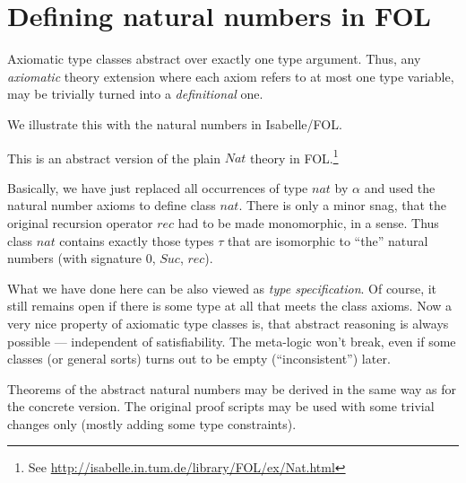 


\section{Defining natural numbers in FOL}\label{sec:ex-natclass}

Axiomatic type classes abstract over exactly one type argument. Thus, any
\emph{axiomatic} theory extension where each axiom refers to at most one type
variable, may be trivially turned into a \emph{definitional} one.

We illustrate this with the natural numbers in Isabelle/FOL.

\bigskip

\bigskip

This is an abstract version of the plain $Nat$ theory in
FOL.\footnote{See \url{http://isabelle.in.tum.de/library/FOL/ex/Nat.html}}

Basically, we have just replaced all occurrences of type $nat$ by $\alpha$ and
used the natural number axioms to define class $nat$.  There is only a minor
snag, that the original recursion operator $rec$ had to be made monomorphic,
in a sense.  Thus class $nat$ contains exactly those types $\tau$ that are
isomorphic to ``the'' natural numbers (with signature $0$, $Suc$, $rec$).

\medskip

What we have done here can be also viewed as \emph{type specification}.  Of
course, it still remains open if there is some type at all that meets the
class axioms.  Now a very nice property of axiomatic type classes is, that
abstract reasoning is always possible --- independent of satisfiability.  The
meta-logic won't break, even if some classes (or general sorts) turns out to
be empty (``inconsistent'') later.

Theorems of the abstract natural numbers may be derived in the same way as for
the concrete version.  The original proof scripts may be used with some
trivial changes only (mostly adding some type constraints).






